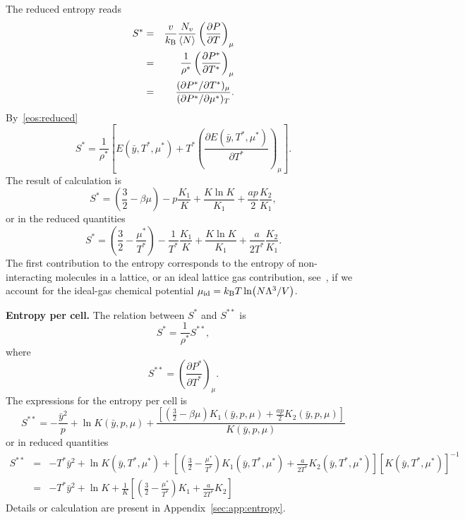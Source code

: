 \documentclass[12pt]{article}
\numberwithin{equation}{section}
\begin{document}
	
	The reduced entropy reads
	\begin{eqnarray}
		S^* & = & \frac{v}{k_{\rm B}} \frac{N_v}{\langle N \rangle} \left(\frac{\partial P}{\partial T}\right)_{\mu}
		\\
		& = & \frac{1}{\rho^*}\left(\frac{\partial P^*}{\partial T^*}\right)_{\mu}
		\\
		& = & \frac{(\partial P^* / \partial T^*)_{\mu}}{(\partial P^* / \partial \mu^*)_T}.
	\end{eqnarray}
	By~\eqref{eos:reduced}
	\begin{equation}
		\label{eq:entropy}
		S^* = \frac{1}{\rho^*} 
		\left[ 
		E(\bar{y},T^*,\mu^*) + T^* \left(\frac{\partial E(\bar{y},T^*,\mu^*)}{\partial T^*}\right)_{\mu} 
		\right].
	\end{equation}
	The result of calculation is
	\begin{equation}
		S^* = \left(\frac{3}{2} - \beta\mu\right) -p \frac{K_1}{K} + \frac{K \ln K}{K_1} + \frac{ap}{2} \frac{K_2}{K_1},
	\end{equation}
	or in the reduced quantities
	\begin{equation}
		\label{S_vs_T_mu}
		S^* = \left(\frac{3}{2} - \frac{\mu^*}{T^*}\right) - \frac{1}{T^*}\frac{K_1}{K} + \frac{K \ln K}{K_1} + \frac{a}{2T^*} \frac{K_2}{K_1}.
	\end{equation}
	The first contribution to the entropy corresponds to the entropy of non-interacting molecules in a lattice, or an ideal lattice gas contribution, see~\cite[(47.4)]{Hill56}, if we account for the ideal-gas chemical potential $\mu_{\rm id} = k_{\rm B}T \ln(N\Lambda^3/V)$. 
	
	
	\textbf{Entropy per cell.} The relation between $S^*$ and $S^{**}$ is
	\begin{equation}
		S^* = \frac{1}{\rho^*} S^{**},
	\end{equation}
	where
	\begin{equation}
		\label{eq:entropy2}
		S^{**}  = \left(\frac{\partial P^*}{\partial T^*}\right)_{\mu}.
	\end{equation}
	The expressions for the entropy per cell is
	\begin{equation}
		S^{**} = -\frac{\bar{y}^2}{p} + \ln K(\bar{y},p,\mu) + \frac{\left[\left(\frac{3}{2} - \beta\mu\right)K_1(\bar{y},p,\mu) + \frac{ap}{2}K_2(\bar{y},p,\mu) \right]}{K(\bar{y},p,\mu)}
	\end{equation}
	or in reduced quantities
	\begin{eqnarray}
		S^{**} & = & -T^* \bar{y}^2 + \ln K(\bar{y},T^*,\mu^*) + \left[\left(\frac{3}{2} - \frac{\mu^*}{T^*}\right) K_1(\bar{y},T^*,\mu^*) + \frac{a}{2T^*} K_2(\bar{y},T^*,\mu^*) \right] [K(\bar{y},T^*,\mu^*)]^{-1}
		\nonumber \\
		& = & -T^* \bar{y}^2 + \ln K + \frac{1}{K}\left[\left(\frac{3}{2} - \frac{\mu^*}{T^*}\right) K_1 + \frac{a}{2T^*} K_2 \right]
	\end{eqnarray}
	Details or calculation are present in Appendix~\ref{sec:app:entropy}.
	
\end{document}
